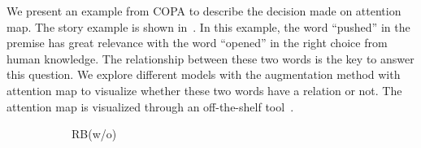 We present an example from COPA to describe the decision made on 
attention map. The story example is shown in~.
In this example, the word ``pushed'' in the premise has great relevance with 
the word ``opened'' in the right choice from human knowledge. 
The relationship between these two words is the key to answer this question. 
We explore different models with the augmentation method with attention map to visualize 
whether these two words have a relation or not.
The attention map is visualized through an off-the-shelf tool~\cite{vig-2019-multiscale}.
\begin{figure}[th!]
\centering
\begin{subfigure}[b]{0.20\textwidth}
\centering

\caption{RB(w/o)}
\label{fig:case_original}
\end{subfigure}
\hfill
\begin{subfigure}[b]{0.20\textwidth}
\centering

\end{subfigure}
\end{figure}
